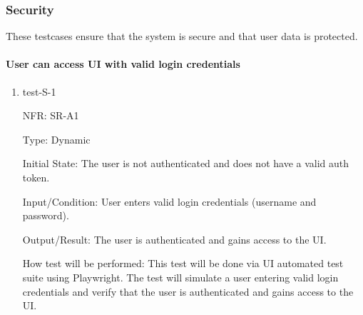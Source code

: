 \documentclass[12pt, titlepage]{article}
\begin{document}
\subsubsection{Security}
These testcases ensure that the system is secure and that user data is protected.

\paragraph{User can access UI with valid login credentials}
\begin{enumerate}
  \item{test-S-1}

  NFR: SR-A1

  Type: Dynamic
            
  Initial State: The user is not authenticated and does not have a valid auth token.
            
  Input/Condition: User enters valid login credentials (username and password).
            
  Output/Result: The user is authenticated and gains access to the UI.
            
  How test will be performed: 
  This test will be done via UI automated test suite using Playwright. The test will simulate a user entering valid login 
  credentials and verify that the user is authenticated and gains access to the UI.
\end{enumerate}
\end{document}
